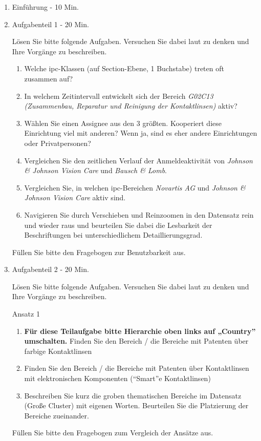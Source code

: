 \begin{enumerate} 
\item Einführung - 10 Min.
\item Aufgabenteil 1 - 20 Min.

Lösen Sie bitte folgende Aufgaben. Versuchen Sie dabei laut zu denken und Ihre Vorgänge zu beschreiben.
\begin{enumerate} 
\item Welche \gls{ipc}-Klassen (auf Section-Ebene, 1 Buchstabe) treten oft zusammen auf? 
\item In welchem Zeitintervall entwickelt sich der Bereich \textit{G02C13 (Zusammenbau, Reparatur und Reinigung der Kontaktlinsen)} aktiv?
\item Wählen Sie einen Assignee aus den 3 größten. Kooperiert diese Einrichtung viel mit anderen? Wenn ja, sind es eher andere Einrichtungen oder Privatpersonen? 
\item Vergleichen Sie den zeitlichen Verlauf der Anmeldeaktivität von \textit{Johnson \& Johnson Vision Care} und \textit{Bausch \& Lomb}.
\item Vergleichen Sie, in welchen \gls{ipc}-Bereichen \textit{Novartis AG} und \textit{Johnson \& Johnson Vision Care} aktiv sind.
\item Navigieren Sie durch Verschieben und Reinzoomen in den Datensatz rein und wieder raus und beurteilen Sie dabei die Lesbarkeit der Beschriftungen bei unterschiedlichem Detaillierungsgrad.
\end{enumerate}

Füllen Sie bitte den Fragebogen zur Benutzbarkeit aus.

\item Aufgabenteil 2 - 20 Min.

Lösen Sie bitte folgende Aufgaben. Versuchen Sie dabei laut zu denken und Ihre Vorgänge zu beschreiben.

Ansatz 1
\begin{enumerate}
\item \textbf{Für diese Teilaufgabe bitte Hierarchie oben links auf „Country” umschalten.} Finden Sie den Bereich / die Bereiche mit Patenten über farbige Kontaktlinsen
\item Finden Sie den Bereich / die Bereiche mit Patenten über Kontaktlinsen mit elektronischen Komponenten (“Smart”e Kontaktlinsen)
\item Beschreiben Sie kurz die groben thematischen Bereiche im Datensatz (Große Cluster) mit eigenen Worten. Beurteilen Sie die Platzierung der Bereiche zueinander.
\end{enumerate}
Füllen Sie bitte den Fragebogen zum Vergleich der Ansätze aus.


\end{enumerate}
